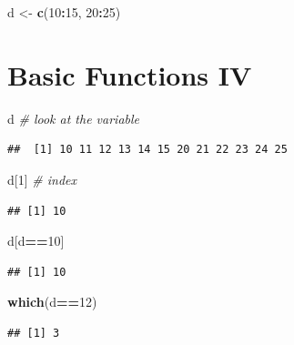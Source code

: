 \documentclass[
]{book}
\newenvironment{Shaded}{\begin{snugshade}}{\end{snugshade}}
\newcommand{\CommentTok}[1]{\textcolor[rgb]{0.56,0.35,0.01}{\textit{#1}}}
\newcommand{\DecValTok}[1]{\textcolor[rgb]{0.00,0.00,0.81}{#1}}
\newcommand{\FunctionTok}[1]{\textcolor[rgb]{0.13,0.29,0.53}{\textbf{#1}}}
\newcommand{\NormalTok}[1]{#1}
\newcommand{\OtherTok}[1]{\textcolor[rgb]{0.56,0.35,0.01}{#1}}
\newcommand{\SpecialCharTok}[1]{\textcolor[rgb]{0.81,0.36,0.00}{\textbf{#1}}}
\begin{document}
\begin{Shaded}
\begin{Highlighting}[]
\NormalTok{d }\OtherTok{\textless{}{-}} \FunctionTok{c}\NormalTok{(}\DecValTok{10}\SpecialCharTok{:}\DecValTok{15}\NormalTok{, }\DecValTok{20}\SpecialCharTok{:}\DecValTok{25}\NormalTok{)}
\end{Highlighting}
\end{Shaded}

\section{Basic Functions IV}\label{basic-functions-iv}

\begin{Shaded}
\begin{Highlighting}[]
\NormalTok{d }\CommentTok{\# look at the variable}
\end{Highlighting}
\end{Shaded}

\begin{verbatim}
##  [1] 10 11 12 13 14 15 20 21 22 23 24 25
\end{verbatim}

\begin{Shaded}
\begin{Highlighting}[]
\NormalTok{d[}\DecValTok{1}\NormalTok{] }\CommentTok{\# index}
\end{Highlighting}
\end{Shaded}

\begin{verbatim}
## [1] 10
\end{verbatim}

\begin{Shaded}
\begin{Highlighting}[]
\NormalTok{d[d}\SpecialCharTok{==}\DecValTok{10}\NormalTok{]}
\end{Highlighting}
\end{Shaded}

\begin{verbatim}
## [1] 10
\end{verbatim}

\begin{Shaded}
\begin{Highlighting}[]
\FunctionTok{which}\NormalTok{(d}\SpecialCharTok{==}\DecValTok{12}\NormalTok{)}
\end{Highlighting}
\end{Shaded}

\begin{verbatim}
## [1] 3
\end{verbatim}
\end{document}
